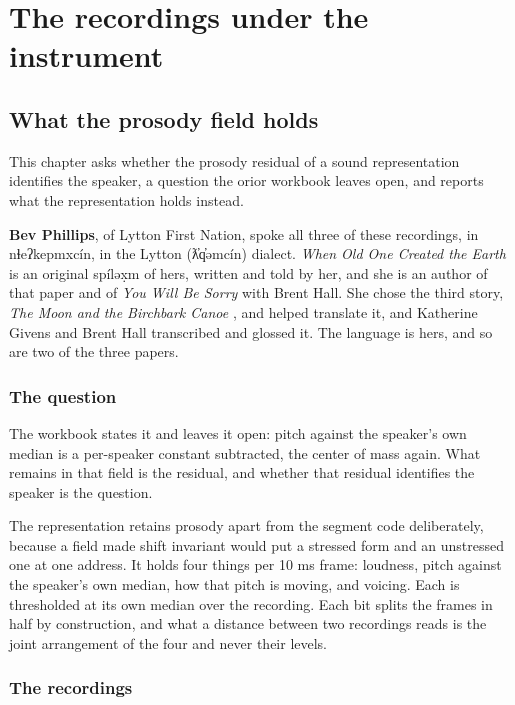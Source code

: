 \chapter{The recordings under the instrument}

\section{What the prosody field holds}

This chapter asks whether the prosody residual of a sound representation identifies the speaker, a
question the orior workbook \cite{src:Quigg-orior-workbook} leaves open, and reports what the
representation holds instead.

\textbf{Bev Phillips}, of Lytton First Nation, spoke all three of these recordings, in
nɬeʔkepmxcín, in the Lytton (ƛ̓q̓əmcín) dialect. \emph{When Old One Created the Earth}
\cite{src:Hall-and-Phillips-2025} is an original spíləx̣m of hers, written and told by her, and she
is an author of that paper and of \emph{You Will Be Sorry} \cite{src:Hall-and-Phillips-2024} with
Brent Hall. She chose the third story, \emph{The Moon and the Birchbark Canoe}
\cite{src:Givens-and-Hall-2023}, and helped translate it, and Katherine Givens and Brent Hall
transcribed and glossed it. The language is hers, and so are two of the three papers.

\subsection{The question}

The workbook states it and leaves it open: pitch against the speaker's own median is a per-speaker
constant subtracted, the center of mass again. What remains in that field is the residual, and
whether that residual identifies the speaker is the question.

The representation retains prosody apart from the segment code deliberately, because a field made
shift invariant would put a stressed form and an unstressed one at one address. It holds four things
per 10 ms frame: loudness, pitch against the speaker's own median, how that pitch is moving, and
voicing. Each is thresholded at its own median over the recording. Each bit splits the frames in
half by construction, and what a distance between two recordings reads is the joint arrangement of
the four and never their levels.

\subsection{The recordings}

